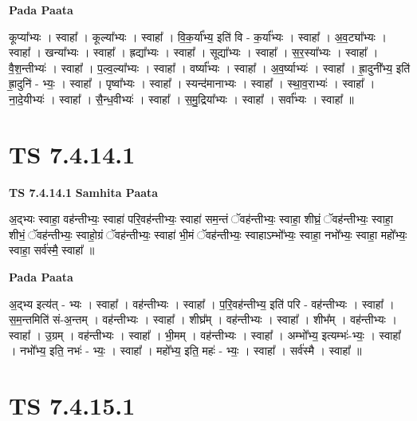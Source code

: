 \documentclass[17pt]{extarticle}
\begin{document}
\textbf{Pada Paata} \newline

कूप्या᳚भ्यः । स्वाहा᳚ । कूल्या᳚भ्यः । स्वाहा᳚ । वि॒क॒र्या᳚भ्य॒ इति॑ वि - क॒र्या᳚भ्यः । स्वाहा᳚ । अ॒व॒ट्या᳚भ्यः । स्वाहा᳚ । खन्या᳚भ्यः । स्वाहा᳚ । ह्रद्या᳚भ्यः । स्वाहा᳚ । सूद्या᳚भ्यः । स्वाहा᳚ । स॒र॒स्या᳚भ्यः । स्वाहा᳚ । वै॒श॒न्तीभ्यः॑ । स्वाहा᳚ । प॒ल्व॒ल्या᳚भ्यः । स्वाहा᳚ । वर्ष्या᳚भ्यः । स्वाहा᳚ । अ॒व॒र्ष्याभ्यः॑ । स्वाहा᳚ । ह्रा॒दुनी᳚भ्य॒ इति॑ ह्रा॒दुनि॑ - भ्यः॒ । स्वाहा᳚ । पृष्वा᳚भ्यः । स्वाहा᳚ । स्यन्द॑मानाभ्यः । स्वाहा᳚ । स्था॒व॒राभ्यः॑ । स्वाहा᳚ । ना॒दे॒यीभ्यः॑ । स्वाहा᳚ । सै॒न्ध॒वीभ्यः॑ । स्वाहा᳚ । स॒मु॒द्रिया᳚भ्यः । स्वाहा᳚ । सर्वा᳚भ्यः । स्वाहा᳚ ॥  \newline




\section*{ TS 7.4.14.1 }

\textbf{TS 7.4.14.1 } \newline
\textbf{Samhita Paata} \newline

अ॒द्भ्यः स्वाहा॒ वह॑न्तीभ्यः॒ स्वाहा॑ परि॒वह॑न्तीभ्यः॒ स्वाहा॑ सम॒न्तं ॅवह॑न्तीभ्यः॒ स्वाहा॒ शीघ्रं॒ ॅवह॑न्तीभ्यः॒ स्वाहा॒ शीभं॒ ॅवह॑न्तीभ्यः॒ स्वाहो॒ग्रं ॅवह॑न्तीभ्यः॒ स्वाहा॑ भी॒मं ॅवह॑न्तीभ्यः॒ स्वाहाऽम्भो᳚भ्यः॒ स्वाहा॒ नभो᳚भ्यः॒ स्वाहा॒ महो᳚भ्यः॒ स्वाहा॒ सर्व॑स्मै॒ स्वाहा᳚ ॥ \newline

\textbf{Pada Paata} \newline

अ॒द्भ्य इत्य॑त् - भ्यः । स्वाहा᳚ । वह॑न्तीभ्यः । स्वाहा᳚ । प॒रि॒वह॑न्तीभ्य॒ इति॑ परि - वह॑न्तीभ्यः । स्वाहा᳚ । स॒म॒न्तमिति॑ सं-अ॒न्तम् । वह॑न्तीभ्यः । स्वाहा᳚ । शीघ्र᳚म् । वह॑न्तीभ्यः । स्वाहा᳚ । शीभ᳚म् । वह॑न्तीभ्यः । स्वाहा᳚ । उ॒ग्रम् । वह॑न्तीभ्यः । स्वाहा᳚ । भी॒मम् । वह॑न्तीभ्यः । स्वाहा᳚ । अम्भो᳚भ्य॒ इत्यम्भः॑-भ्यः॒ । स्वाहा᳚ । नभो᳚भ्य॒ इति॒ नभः॑ - भ्यः॒ । स्वाहा᳚ । महो᳚भ्य॒ इति॒ महः॑ - भ्यः॒ । स्वाहा᳚ । सर्व॑स्मै । स्वाहा᳚ ॥  \newline




\section*{ TS 7.4.15.1 }
\end{document}
